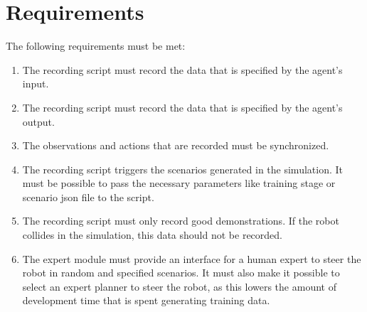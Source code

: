 \section{Requirements}
The following requirements must be met:
\begin{enumerate}
    \item The recording script must record the data that is specified by the agent’s input.
    \item The recording script must record the data that is specified by the agent’s output.
    \item The observations and actions that are recorded must be synchronized.
    \item The recording script triggers the scenarios generated in the simulation. It must be possible to pass the necessary parameters like training stage or scenario json file to the script.
    \item The recording script must only record good demonstrations. If the robot collides in the simulation, this data should not be recorded.
    \item The expert module must provide an interface for a human expert to steer the robot in random and specified scenarios. It must also make it possible to select an expert planner to steer the robot, as this lowers the amount of development time that is spent generating training data.
\end{enumerate}
